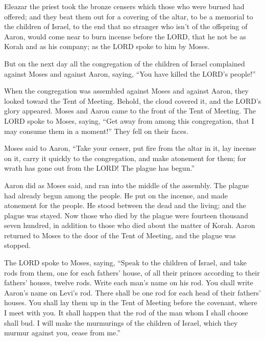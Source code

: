 \myverse{}Eleazar the priest took the bronze censers which those who were
burned had offered; and they beat them out for a covering of the altar,
\myverse{}to be a memorial to the children of Israel, to the end that no stranger who
isn’t of the offspring of Aaron, would come near to burn incense before the LORD, that he not be as Korah
and as his company; as the LORD spoke to him by Moses.


\myverse{}But on the next day all the congregation of the children of
Israel complained against Moses and against Aaron, saying, “You have killed the LORD’s people!”


\myverse{}When the congregation was assembled against Moses and against
Aaron, they looked toward the Tent of Meeting. Behold, the cloud covered it, and the LORD’s glory appeared.
\myverse{}Moses and Aaron came to the front of the Tent of Meeting.
\myverse{}The LORD spoke to Moses, saying,
\myverse{}“Get away from among this congregation, that I may consume them in a moment!”
They fell on their faces.


\myverse{}Moses said to Aaron, “Take your censer, put fire from the altar
in it, lay incense on it, carry it quickly to the congregation, and make atonement for them; for wrath
has gone out from the LORD! The plague has begun.”


\myverse{}Aaron did as Moses said, and ran into the middle of the assembly.
The plague had already begun among the people. He put on the incense, and made atonement for the people.
\myverse{}He stood between the dead and the living; and the plague was stayed.
\myverse{}Now those who died by the plague were fourteen thousand seven hundred, in
addition to those who died about the matter of Korah.
\myverse{}Aaron returned to Moses to the door of the Tent of Meeting, and the plague
was stopped.


\mychapter{} \myverse*{}The LORD spoke to Moses, saying,
\myverse{}“Speak to the children of Israel, and take rods from them, one for each fathers’
house, of all their princes according to their fathers’ houses, twelve rods. Write each man’s name on
his rod.
\myverse{}You shall write Aaron’s name on Levi’s rod. There shall be one rod for each
head of their fathers’ houses.
\myverse{}You shall lay them up in the Tent of Meeting before the covenant, where I meet
with you.
\myverse{}It shall happen that the rod of the man whom I shall choose shall bud. I will
make the murmurings of the children of Israel, which they murmur against you, cease from me.”


